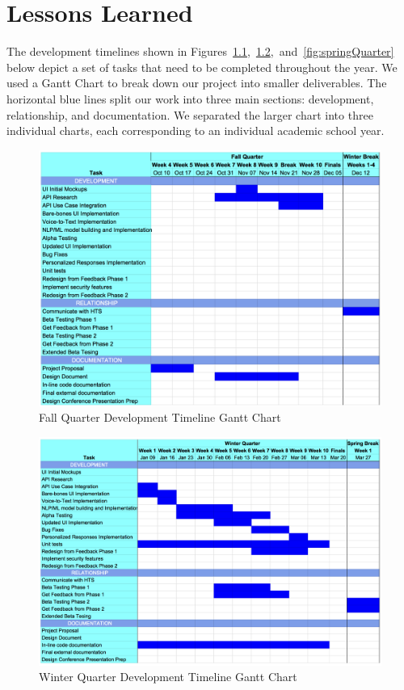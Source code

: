 \chapter{Lessons Learned}
The development timelines shown in Figures~\ref{fig:fallQuarter},~\ref{fig:winterQuarter},~and~\ref{fig:springQuarter} below depict a set of tasks that need to be completed throughout the year. We used a Gantt Chart to break down our project into smaller deliverables. The horizontal blue lines split our work into three main sections: development, relationship, and documentation. We separated the larger chart into three individual charts, each corresponding to an individual academic school year.

\begin{figure}[htb]
\centering
\includegraphics[width =\textwidth]{fallQuarter.png}
\caption{Fall Quarter Development Timeline Gantt Chart}
\label{fig:fallQuarter}
\end{figure}

\begin{figure}[htb]
\centering
\includegraphics[width =\textwidth]{winterQuarter.png}
\caption{Winter Quarter Development Timeline Gantt Chart}
\label{fig:winterQuarter}
\end{figure}

